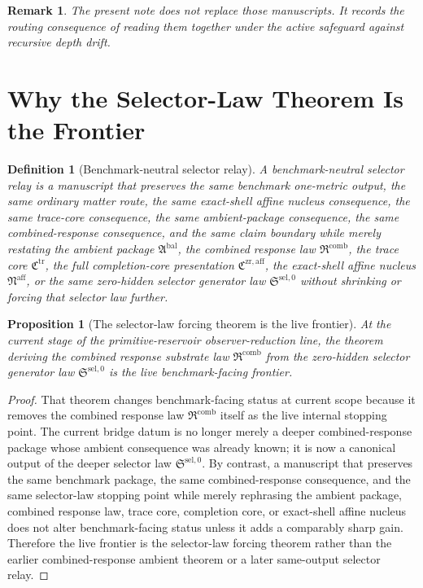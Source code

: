 \documentclass[11pt]{article}
\newcommand{\CompletionCore}{\mathfrak C^{\mathrm{zr,aff}}}
\newcommand{\TraceCore}{\mathfrak C^{\mathrm{tr}}}
\newcommand{\AffineNucleus}{\mathfrak N^{\mathrm{aff}}}
\newcommand{\AmbientPackage}{\mathfrak A^{\mathrm{bal}}}
\newcommand{\CombinedLaw}{\mathfrak R^{\mathrm{comb}}}
\newcommand{\SelectorLaw}{\mathfrak S^{\mathrm{sel},0}}
\newtheorem{definition}{Definition}
\newtheorem{proposition}{Proposition}
\newtheorem{remark}{Remark}
\begin{document}
\begin{remark}
The present note does not replace those manuscripts. It records the routing consequence of reading them together under the active safeguard against recursive depth drift.
\end{remark}

\section{Why the Selector-Law Theorem Is the Frontier}

\begin{definition}[Benchmark-neutral selector relay]
A \emph{benchmark-neutral selector relay} is a manuscript that preserves the same benchmark one-metric output, the same ordinary matter route, the same exact-shell affine nucleus consequence, the same trace-core consequence, the same ambient-package consequence, the same combined-response consequence, and the same claim boundary while merely restating the ambient package \(\AmbientPackage\), the combined response law \(\CombinedLaw\), the trace core \(\TraceCore\), the full completion-core presentation \(\CompletionCore\), the exact-shell affine nucleus \(\AffineNucleus\), or the same zero-hidden selector generator law \(\SelectorLaw\) without shrinking or forcing that selector law further.
\end{definition}

\begin{proposition}[The selector-law forcing theorem is the live frontier]
At the current stage of the primitive-reservoir observer-reduction line, the theorem deriving the combined response substrate law \(\CombinedLaw\) from the zero-hidden selector generator law \(\SelectorLaw\) is the live benchmark-facing frontier.
\end{proposition}

\begin{proof}
That theorem changes benchmark-facing status at current scope because it removes the combined response law \(\CombinedLaw\) itself as the live internal stopping point. The current bridge datum is no longer merely a deeper combined-response package whose ambient consequence was already known; it is now a canonical output of the deeper selector law \(\SelectorLaw\). By contrast, a manuscript that preserves the same benchmark package, the same combined-response consequence, and the same selector-law stopping point while merely rephrasing the ambient package, combined response law, trace core, completion core, or exact-shell affine nucleus does not alter benchmark-facing status unless it adds a comparably sharp gain. Therefore the live frontier is the selector-law forcing theorem rather than the earlier combined-response ambient theorem or a later same-output selector relay.
\end{proof}
\end{document}

